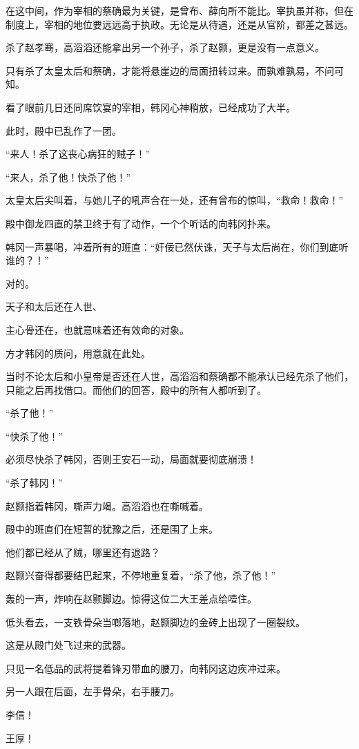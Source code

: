 在这中间，作为宰相的蔡确最为关键，是曾布、薛向所不能比。宰执虽并称，但在制度上，宰相的地位要远远高于执政。无论是从待遇，还是从官阶，都差之甚远。

杀了赵孝骞，高滔滔还能拿出另一个孙子，杀了赵颢，更是没有一点意义。

只有杀了太皇太后和蔡确，才能将悬崖边的局面扭转过来。而孰难孰易，不问可知。

看了眼前几日还同席饮宴的宰相，韩冈心神稍放，已经成功了大半。

此时，殿中已乱作了一团。

“来人！杀了这丧心病狂的贼子！”

“来人，杀了他！快杀了他！”

太皇太后尖叫着，与她儿子的吼声合在一处，还有曾布的惊叫，“救命！救命！”

殿中御龙四直的禁卫终于有了动作，一个个听话的向韩冈扑来。

韩冈一声暴喝，冲着所有的班直：“奸佞已然伏诛，天子与太后尚在，你们到底听谁的？！”

对的。

天子和太后还在人世、

主心骨还在，也就意味着还有效命的对象。

方才韩冈的质问，用意就在此处。

当时不论太后和小皇帝是否还在人世，高滔滔和蔡确都不能承认已经先杀了他们，只能之后再找借口。而他们的回答，殿中的所有人都听到了。

“杀了他！”

“快杀了他！”

必须尽快杀了韩冈，否则王安石一动，局面就要彻底崩溃！

“杀了韩冈！”

赵颢指着韩冈，嘶声力竭。高滔滔也在嘶喊着。

殿中的班直们在短暂的犹豫之后，还是围了上来。

他们都已经从了贼，哪里还有退路？

赵颢兴奋得都要结巴起来，不停地重复着，“杀了他，杀了他！”

轰的一声，炸响在赵颢脚边。惊得这位二大王差点给噎住。

低头看去，一支铁骨朵当啷落地，赵颢脚边的金砖上出现了一圈裂纹。

这是从殿门处飞过来的武器。

只见一名低品的武将提着锋刃带血的腰刀，向韩冈这边疾冲过来。

另一人跟在后面，左手骨朵，右手腰刀。

李信！

王厚！

